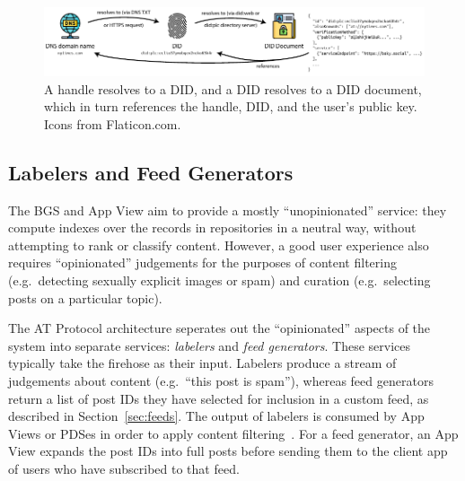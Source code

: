 \documentclass[sigconf,review]{acmart}
\begin{document}
\begin{figure}
    \centering
    \includegraphics[width=\linewidth]{identity.pdf}
    \caption{A handle resolves to a DID, and a DID resolves to a DID document, which in turn references the handle, DID, and the user's public key. Icons from Flaticon.com.}
    \label{fig:identity}
\end{figure}


\subsection{Labelers and Feed Generators}\label{sec:labeling}

The BGS and App View aim to provide a mostly ``unopinionated'' service: they compute indexes over the records in repositories in a neutral way, without attempting to rank or classify content.
However, a good user experience also requires ``opinionated'' judgements for the purposes of content filtering (e.g.\ detecting sexually explicit images or spam) and curation (e.g.\ selecting posts on a particular topic).

The AT Protocol architecture seperates out the ``opinionated'' aspects of the system into separate services: \emph{labelers} and \emph{feed generators}.
These services typically take the firehose as their input.
Labelers produce a stream of judgements about content (e.g.\ ``this post is spam''), whereas feed generators return a list of post IDs they have selected for inclusion in a custom feed, as described in Section~\ref{sec:feeds}.
The output of labelers is consumed by App Views or PDSes in order to apply content filtering~\cite{Labeling}.
For a feed generator, an App View expands the post IDs into full posts before sending them to the client app of users who have subscribed to that feed.
\end{document}
